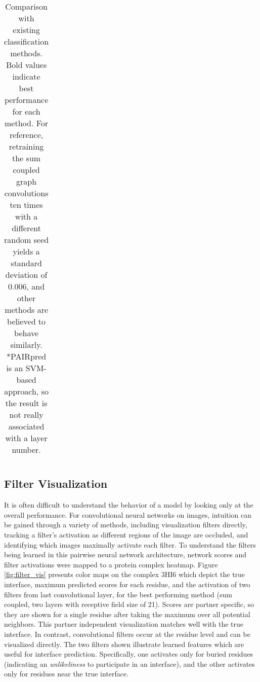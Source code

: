 \begin{table}
\begin{center}
\begin{tabular}{l c c c c c }
			\bottomrule
			
		\end{tabular}
		\caption{Comparison with existing classification methods. Bold values indicate best performance for each method. For reference, retraining the sum coupled graph convolutions ten times with a different random seed yields a standard deviation of 0.006, and other methods are believed to behave similarly. *PAIRpred is an SVM-based approach, so the result is not really associated with a layer number.}
		\label{tab:results_compare}
	\end{center}
\end{table}



\subsection{Filter Visualization}

It is often difficult to understand the behavior of a model by looking only at the overall performance. 
For convolutional neural networks on images, intuition can be gained through a variety of methods, including visualization filters directly, tracking a filter's activation as different regions of the image are occluded, and identifying which images maximally activate each filter. 
To understand the filters being learned in this pairwise neural network architecture, network scores and filter activations were mapped to a protein complex heatmap.
Figure \ref{fig:filter_vis} presents color maps on the complex 3HI6 which depict the true interface, maximum predicted scores for each residue, and the activation of two filters from last convolutional layer, for the best performing method (sum coupled, two layers with receptive field size of 21).
Scores are partner specific, so they are shown for a single residue after taking the maximum over all potential neighbors.
This partner independent visualization matches well with the true interface.
In contrast, convolutional filters occur at the residue level and can be visualized directly. 
The two filters shown illustrate learned features which are useful for interface prediction.
Specifically, one activates only for buried residues (indicating an \emph{unlikeliness} to participate in an interface), and the other activates only for residues near the true interface.

